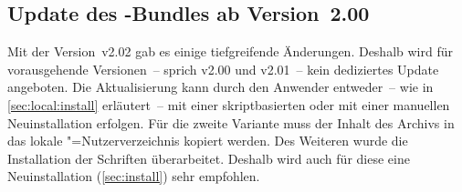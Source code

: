 \subsection{Update des \TUDScript-Bundles ab Version~2.00}
Mit der Version~v2.02 gab es einige tiefgreifende Änderungen. Deshalb wird für 
vorausgehende Versionen~-- sprich v2.00 und v2.01~-- kein dediziertes Update 
angeboten. Die Aktualisierung kann durch den Anwender entweder~-- wie in 
\autoref{sec:local:install} erläutert~-- mit einer skriptbasierten oder mit 
einer manuellen Neuinstallation erfolgen. Für die zweite Variante muss 
der Inhalt des Archivs
%
{} in das lokale "=Nutzerverzeichnis 
kopiert werden. Des Weiteren wurde die Installation der Schriften überarbeitet. 
Deshalb wird auch für diese eine Neuinstallation (\autoref{sec:install}) sehr 
empfohlen.
%


